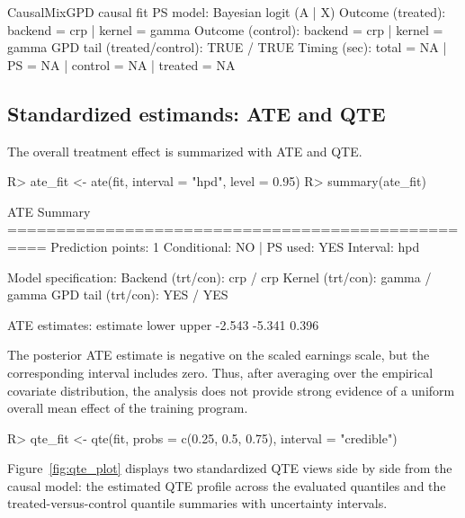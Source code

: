\documentclass[11pt]{article}\usepackage[]{graphicx}\usepackage[]{xcolor}
\renewenvironment{Schunk}{\vspace{0pt}}{\vspace{-0.1\baselineskip}}
\begin{document}
\begin{Schunk}
\begin{Soutput}
CausalMixGPD causal fit
PS model: Bayesian logit (A | X) 
Outcome (treated): backend = crp | kernel = gamma 
Outcome (control): backend = crp | kernel = gamma 
GPD tail (treated/control): TRUE / TRUE 
Timing (sec): total =   NA | PS =   NA | control =   NA | treated =   NA  
\end{Soutput}
\end{Schunk}

\subsection{Standardized estimands: ATE and QTE}

The overall treatment effect is summarized with ATE and QTE.

\begin{Schunk}
\begin{Sinput}
R> ate_fit <- ate(fit, interval = "hpd", level = 0.95)
R> summary(ate_fit)
\end{Sinput}
\begin{Soutput}
ATE Summary
================================================== 
Prediction points: 1
Conditional: NO | PS used: YES
Interval: hpd

Model specification:
  Backend (trt/con): crp / crp
  Kernel (trt/con): gamma / gamma
  GPD tail (trt/con): YES / YES

ATE estimates:
 estimate  lower upper
   -2.543 -5.341 0.396
\end{Soutput}
\end{Schunk}

The posterior ATE estimate is negative on the scaled earnings scale,
but the corresponding interval includes zero. Thus, after averaging
over the empirical covariate distribution, the analysis does not
provide strong evidence of a uniform overall mean effect of the
training program.

\begin{Schunk}
\begin{Sinput}
R> qte_fit <- qte(fit, probs = c(0.25, 0.5, 0.75), interval = "credible")
\end{Sinput}
\end{Schunk}

Figure~\ref{fig:qte_plot} displays two standardized QTE views side by
side from the causal model: the estimated QTE profile across the
evaluated quantiles and the treated-versus-control quantile summaries
with uncertainty intervals.
\end{document}
